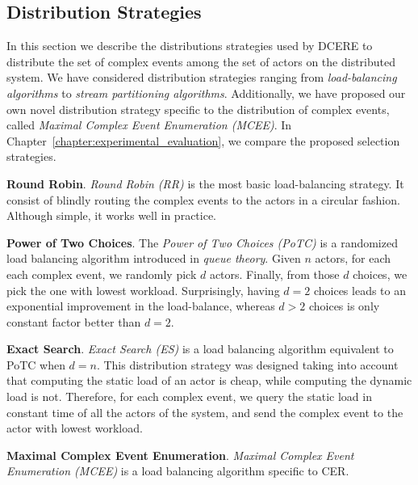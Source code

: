 \subsection{Distribution Strategies}\label{subsec:dcere:distribution-strategies}

In this section we describe the distributions strategies used by DCERE to distribute the set of complex events among the set of actors on the distributed system. We have considered distribution strategies ranging from \emph{load-balancing algorithms} to \emph{stream partitioning algorithms}. Additionally, we have proposed our own novel distribution strategy specific to the distribution of complex events, called \emph{Maximal Complex Event Enumeration (MCEE)}. In Chapter~\ref{chapter:experimental_evaluation}, we compare the proposed selection strategies.

\textbf{Round Robin}. \emph{Round Robin (RR)} is the most basic load-balancing strategy. It consist of blindly routing the complex events to the actors in a circular fashion. Although simple, it works well in practice.

\textbf{Power of Two Choices}. The \emph{Power of Two Choices (PoTC)} \cite{load-balancing-1} is a randomized load balancing algorithm introduced in \emph{queue theory}. Given $n$ actors, for each each complex event, we randomly pick $d$ actors. Finally, from those $d$ choices, we pick the one with lowest workload. Surprisingly, having $d = 2$ choices leads to an exponential improvement in the load-balance, whereas $d > 2$ choices is only constant factor better than $d = 2$.

\textbf{Exact Search}. \emph{Exact Search (ES)} is a load balancing algorithm equivalent to PoTC when $d = n$. This distribution strategy was designed taking into account that computing the static load of an actor is cheap, while computing the dynamic load is not. Therefore, for each complex event, we query the static load in constant time of all the actors of the system, and send the complex event to the actor with lowest workload.

\textbf{Maximal Complex Event Enumeration}. \emph{Maximal Complex Event Enumeration (MCEE)} is a load balancing algorithm specific to CER.

